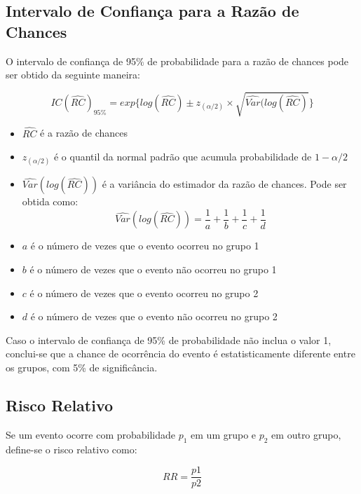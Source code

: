 \documentclass[
]{estat/estat}
\begin{document}
\subsection{Intervalo de Confiança para a Razão de
Chances}\label{intervalo-de-confianuxe7a-para-a-razuxe3o-de-chances}

\par O intervalo de confiança de 95\% de probabilidade para a razão de chances pode ser obtido da seguinte maneira:

$$IC(\hat{RC})_{95\%}=exp\{log(\hat{RC})\pm z_{(\alpha/2)}\times\sqrt{\hat{Var}(log(\hat{RC})}\}$$

\begin{itemize}

    \item $\hat{RC}$ é a razão de chances
    \item $z_{(\alpha/2)}$ é o quantil da normal padrão que acumula probabilidade de $1-\alpha/2$
    \item $\hat{Var}(log(\hat{RC}))$ é a variância do estimador da razão de chances. Pode ser obtida como:
    $$\hat{Var}(log(\hat{RC}))=\frac{1}{a}+\frac{1}{b}+\frac{1}{c}+\frac{1}{d}$$
    
    \item $a$ é o número de vezes que o evento ocorreu no grupo 1
    \item $b$ é o número de vezes que o evento não ocorreu no grupo 1
    \item $c$ é o número de vezes que o evento ocorreu no grupo 2
    \item $d$ é o número de vezes que o evento não ocorreu no grupo 2
    
\end{itemize}

\par Caso o intervalo de confiança de 95\% de probabilidade não inclua o valor 1, conclui-se que a chance de ocorrência do evento é estatisticamente diferente entre os grupos, com 5\% de significância.

\subsection{Risco Relativo}\label{risco-relativo}

\par Se um evento ocorre com probabilidade $p_1$ em um grupo e $p_2$ em outro grupo, define-se o risco relativo como:

$$RR=\frac{p1}{p2}$$
\end{document}

